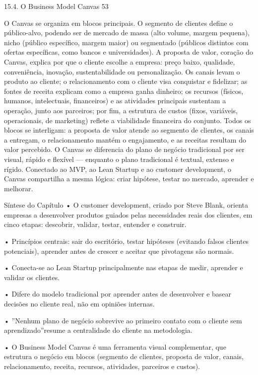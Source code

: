 15.4. O Business Model Canvas 53

O Canvas se organiza em blocos principais. O segmento de clientes define o público-alvo, podendo ser de mercado de massa (alto volume, margem pequena), nicho (público específico, margem maior) ou segmentado (públicos distintos com ofertas específicas, como bancos e universidades). A proposta de valor, coração do Canvas, explica por que o cliente escolhe a empresa: preço baixo, qualidade, conveniência, inovação, sustentabilidade ou personalização. Os canais levam o produto ao cliente; o relacionamento com o cliente visa conquistar e fidelizar; as fontes de receita explicam como a empresa ganha dinheiro; os recursos (físicos, humanos, intelectuais, financeiros) e as atividades principais sustentam a operação, junto aos parceiros; por fim, a estrutura de custos (fixos, variáveis, operacionais, de marketing) reflete a viabilidade financeira do conjunto. Todos os blocos se interligam: a proposta de valor atende ao segmento de clientes, os canais a entregam, o relacionamento mantém o engajamento, e as receitas resultam do valor percebido. O Canvas se diferencia do plano de negócio tradicional por ser visual, rápido e flexível — enquanto o plano tradicional é textual, extenso e rígido. Conectado ao MVP, ao Lean Startup e ao customer development, o Canvas compartilha a mesma lógica: criar hipótese, testar no mercado, aprender e melhorar.

Síntese do Capítulo • O customer development, criado por Steve Blank, orienta empresas a desenvolver produtos guiados pelas necessidades reais dos clientes, em cinco etapas: descobrir, validar, testar, entender e construir.

• Princípios centrais: sair do escritório, testar hipóteses (evitando falsos clientes potenciais), aprender antes de crescer e aceitar que pivotagens são normais.

• Conecta-se ao Lean Startup principalmente nas etapas de medir, aprender e validar os clientes.

• Difere do modelo tradicional por aprender antes de desenvolver e basear decisões no cliente real, não em opiniões internas.

• ”Nenhum plano de negócio sobrevive ao primeiro contato com o cliente sem aprendizado”resume a centralidade do cliente na metodologia.

• O Business Model Canvas é uma ferramenta visual complementar, que estrutura o negócio em blocos (segmento de clientes, proposta de valor, canais, relacionamento, receita, recursos, atividades, parceiros e custos).


